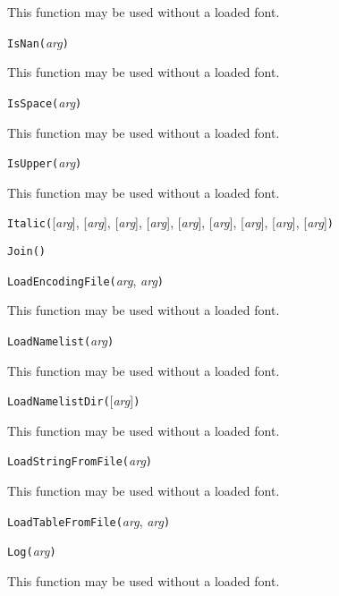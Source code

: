 This function may be used without a loaded font.


\noindent\texttt{IsNan(}\textit{arg}\texttt{)}

This function may be used without a loaded font.


\noindent\texttt{IsSpace(}\textit{arg}\texttt{)}

This function may be used without a loaded font.


\noindent\texttt{IsUpper(}\textit{arg}\texttt{)}

This function may be used without a loaded font.


\noindent\texttt{Italic(}[\textit{arg}], [\textit{arg}], [\textit{arg}], [\textit{arg}], [\textit{arg}], [\textit{arg}], [\textit{arg}], [\textit{arg}], [\textit{arg}]\texttt{)}


\noindent\texttt{Join(}\texttt{)}


\noindent\texttt{LoadEncodingFile(}\textit{arg}, \textit{arg}\texttt{)}

This function may be used without a loaded font.


\noindent\texttt{LoadNamelist(}\textit{arg}\texttt{)}

This function may be used without a loaded font.


\noindent\texttt{LoadNamelistDir(}[\textit{arg}]\texttt{)}

This function may be used without a loaded font.


\noindent\texttt{LoadStringFromFile(}\textit{arg}\texttt{)}

This function may be used without a loaded font.


\noindent\texttt{LoadTableFromFile(}\textit{arg}, \textit{arg}\texttt{)}


\noindent\texttt{Log(}\textit{arg}\texttt{)}

This function may be used without a loaded font.

